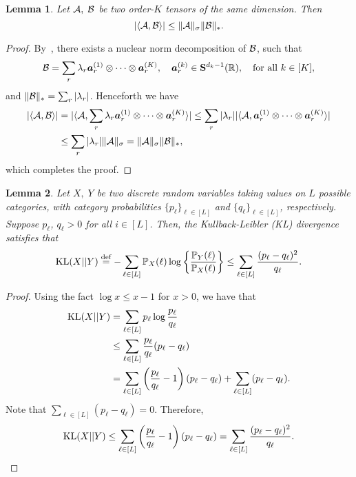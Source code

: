 \documentclass[11pt]{article}
\theoremstyle{plain}
\newtheorem{lem}{Lemma}
\theoremstyle{definition}
\begin{document}
\begin{lem} \label{lem:inq}
Let $\mathcal{A}, \; \mathcal{B}$ be two order-$K$ tensors of the same dimension. Then
\[ 
|\langle \mathcal{A},\mathcal{B}\rangle| \leq \lVert\mathcal{A}\rVert_\sigma   \lVert\mathcal{B}\rVert_*.
\]
\end{lem}

\begin{proof}
By~\citet[Proposition 3.1]{friedland2018nuclear}, there exists a nuclear norm decomposition of $\mathcal{B}$, such that
\[
\mathcal{B}=\sum_{r} \lambda_r \bm{a}^{(1)}_r\otimes \cdots\otimes \bm{a}^{(K)}_r,\quad \bm{a}_r^{(k)}\in\mathbf{S}^{d_k-1}(\mathbb{R}),\quad \text{for all }k\in[K],
\]
and $\lVert\mathcal{B}\rVert_*=\sum_{r}|\lambda_r|$. Henceforth we have
\begin{align*}
|\langle \mathcal{A},\mathcal{B}\rangle|&=| \langle \mathcal{A}, \sum_{r} \lambda_r \bm{a}^{(1)}_r\otimes \cdots\otimes \bm{a}^{(K)}_r \rangle|\leq \sum_r |\lambda_r| |\langle \mathcal{A}, \bm{a}^{(1)}_r \otimes \cdots\otimes \bm{a}^{(K)}_r \rangle|\\
&\leq \sum_{r}|\lambda_r| \lVert\mathcal{A}\rVert_\sigma= \lVert\mathcal{A}\rVert_\sigma\lVert\mathcal{B}\rVert_*,
\end{align*}
which completes the proof. 
\end{proof}


\begin{lem}\label{lem:KLentry} Let $X,\; Y$ be two discrete random variables taking values on $L$ possible categories, with category probabilities $\{p_\ell\}_{\ell\in[L]}$ and $\{q_\ell\}_{\ell\in[L]}$, respectively.  Suppose $p_\ell$, $q_\ell>0$ for all $i\in[L]$. Then, the Kullback-Leibler (KL) divergence satisfies that
\[
\text{KL}(X||Y)\stackrel{\text{def}}{=}-\sum_{\ell\in[L]}\mathbb{P}_X(\ell)\log\left\{{\mathbb{P}_Y(\ell)\over \mathbb{P}_X(\ell)}\right\} \leq \sum_{\ell \in [L]}{(p_\ell-q_\ell)^2 \over q_\ell}.
\]
\end{lem}
\begin{proof} Using the fact $\log x\leq x-1$ for $x>0$, we have that
\begin{align}\label{eq:KL}
\text{KL}(X||Y)&=\sum_{\ell\in[L]}p_\ell\log{p_\ell\over q_\ell}\\
&\leq \sum_{\ell\in[L]} {p_\ell\over q_\ell}(p_\ell-q_\ell)\\
&=\sum_{\ell\in[L]} \left({p_\ell\over q_\ell }- 1\right)(p_\ell-q_\ell)+ \sum_{\ell\in[L]} (p_\ell-q_\ell).
\end{align}
Note that $\sum_{\ell\in[L]}(p_\ell-q_\ell)=0$. Therefore,
\[
\text{KL}(X||Y)\leq \sum_{\ell\in[L]}\left( {p_\ell\over q_\ell}-1\right)\left(p_\ell-q_\ell\right)=\sum_{\ell\in[L]}{(p_\ell-q_\ell)^2\over q_\ell}.
\]
\end{proof}
\end{document}
